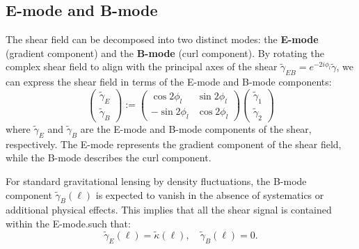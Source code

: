 \subsection{E-mode and B-mode}
The shear field can be decomposed into two distinct modes: the \textbf{E-mode} (gradient component) and the \textbf{B-mode} (curl component). 
By rotating the complex shear field to align with the principal axes of the shear $\tilde{\gamma}_{EB} = e^{-2i\phi_l} \tilde{\gamma}$, we can express the shear field in terms of the E-mode and B-mode components:
\begin{equation}
    \begin{pmatrix}
        \tilde{\gamma}_E \\
        \tilde{\gamma}_B
        \end{pmatrix}
        :=
        \begin{pmatrix}
        \cos 2\phi_l & \sin 2\phi_l \\
        -\sin 2\phi_l & \cos 2\phi_l
        \end{pmatrix}
        \begin{pmatrix}
        \tilde{\gamma}_1 \\
        \tilde{\gamma}_2
    \end{pmatrix}
    \label{eq:EB_decomposition}
\end{equation}
where $\tilde{\gamma}_E$ and $\tilde{\gamma}_B$ are the E-mode and B-mode components of the shear, respectively. The E-mode represents the gradient component of the shear field, while the B-mode describes the curl component.

For standard gravitational lensing by density fluctuations, the B-mode component $\tilde{\gamma}_B(\boldsymbol{\ell})$ is expected to vanish in the absence of systematics or additional physical effects. This implies that all the shear signal is contained within the E-mode.such that:
\begin{equation}
    \tilde{\gamma}_E(\boldsymbol{\ell}) = \tilde{\kappa}(\boldsymbol{\ell}), \quad \tilde{\gamma}_B(\boldsymbol{\ell}) = 0.
    \label{eq:EB_decomposition_standard}
\end{equation}

